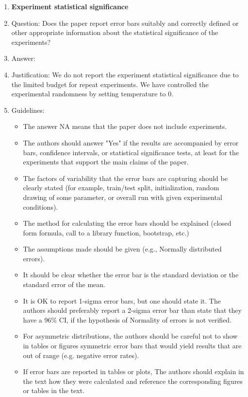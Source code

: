 \begin{enumerate}
\item {\bf Experiment statistical significance}
    \item[] Question: Does the paper report error bars suitably and correctly defined or other appropriate information about the statistical significance of the experiments?
    \item[] Answer: \answerNo{} %
    \item[] Justification: We do not report the experiment statistical significance due to the limited budget for repeat experiments. We have controlled the experimental randomness by setting temperature to 0.
    \item[] Guidelines:
    \begin{itemize}
        \item The answer NA means that the paper does not include experiments.
        \item The authors should answer "Yes" if the results are accompanied by error bars, confidence intervals, or statistical significance tests, at least for the experiments that support the main claims of the paper.
        \item The factors of variability that the error bars are capturing should be clearly stated (for example, train/test split, initialization, random drawing of some parameter, or overall run with given experimental conditions).
        \item The method for calculating the error bars should be explained (closed form formula, call to a library function, bootstrap, etc.)
        \item The assumptions made should be given (e.g., Normally distributed errors).
        \item It should be clear whether the error bar is the standard deviation or the standard error of the mean.
        \item It is OK to report 1-sigma error bars, but one should state it. The authors should preferably report a 2-sigma error bar than state that they have a 96\% CI, if the hypothesis of Normality of errors is not verified.
        \item For asymmetric distributions, the authors should be careful not to show in tables or figures symmetric error bars that would yield results that are out of range (e.g. negative error rates).
        \item If error bars are reported in tables or plots, The authors should explain in the text how they were calculated and reference the corresponding figures or tables in the text.
    \end{itemize}


\end{enumerate}
